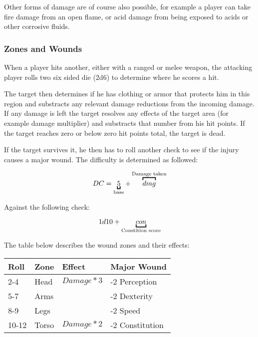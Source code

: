 Other forms of damage are of course also possible, for example a player can
take fire damage from an open flame, or acid damage from being exposed to
acids or other corrosive fluids.

\subsubsection{Zones and Wounds}

When a player hits another, either with a ranged or melee weapon, the attacking
player rolls two six sided die (2d6) to determine where he scores a hit.

The target then determines if he has clothing or armor that protects him in this
region and substracts any relevant damage reductions from the incoming damage.
If any damage is left the target resolves any effects of the target area (for
example damage multiplier) and substracts that number from his hit points. If
the target reaches zero or below zero hit points total, the target is dead.

If the target survives it, he then has to roll another check to see if the
injury causes a major wound. The difficulty is determined as followed:

\[
DC = \ub{5}{base} + \ob{dmg}{Damage taken}
\]

Against the following check:

\[
1d10 + \ub{con}{Constition score}
\]

The table below describes the wound zones and their effects:

\begin{center}
  \begin{tabular}{|l|l|l|l|}
    \hline
    Roll  & Zone  & Effect           & Major Wound     \\ \hline
    2-4   & Head  & \( Damage * 3 \) & -2 Perception   \\ \hline
    5-7   & Arms  &                  & -2 Dexterity    \\ \hline
    8-9   & Legs  &                  & -2 Speed        \\ \hline
    10-12 & Torso & \(Damage * 2 \)  & -2 Constitution \\
    \hline
  \end{tabular}
\end{center}
